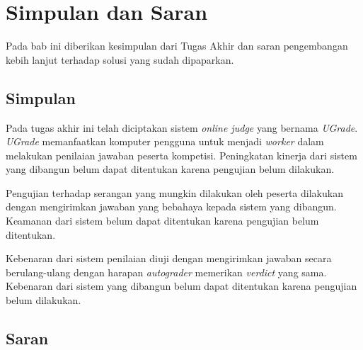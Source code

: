 \chapter{Simpulan dan Saran}

\par Pada bab ini diberikan kesimpulan dari Tugas Akhir dan saran pengembangan kebih lanjut terhadap solusi yang sudah dipaparkan.

\section{Simpulan}


\par Pada tugas akhir ini telah diciptakan sistem \textit{online judge} yang bernama \textit{UGrade}. \textit{UGrade} memanfaatkan komputer pengguna untuk menjadi \textit{worker} dalam melakukan penilaian jawaban peserta kompetisi. Peningkatan kinerja dari sistem yang dibangun belum dapat ditentukan karena pengujian belum dilakukan.

\par Pengujian terhadap serangan yang mungkin dilakukan oleh peserta dilakukan dengan mengirimkan jawaban yang bebahaya kepada sistem yang dibangun. Keamanan dari sistem belum dapat ditentukan karena pengujian belum ditentukan.

\par Kebenaran dari sistem penilaian diuji dengan mengirimkan jawaban secara berulang-ulang dengan harapan \textit{autograder} memerikan \textit{verdict} yang sama. Kebenaran dari sistem yang dibangun belum dapat ditentukan karena pengujian belum dilakukan.

\section{Saran}

